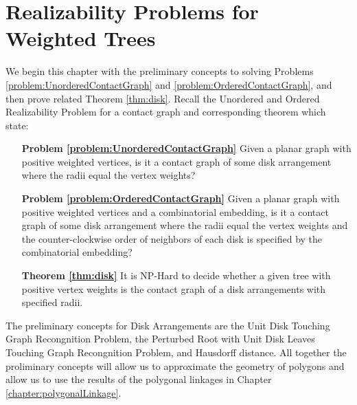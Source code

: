 \chapter{Realizability Problems for Weighted Trees}\label{chp:disk}

We begin this chapter with the preliminary concepts to solving Problems \ref{problem:UnorderedContactGraph} and \ref{problem:OrderedContactGraph}, and then prove related Theorem \ref{thm:disk}.  
Recall the Unordered and Ordered Realizability Problem for a contact graph  and corresponding theorem which state:

\begin{itemize}
\item[\textbf{Problem \ref{problem:UnorderedContactGraph}}] Given a planar graph with positive weighted vertices, is it a contact graph of some disk arrangement where the radii equal the vertex weights?
\item[\textbf{Problem \ref{problem:OrderedContactGraph}}] Given a planar graph with positive weighted vertices and a combinatorial embedding, is it a contact graph of some disk arrangement where the radii equal the vertex weights and the counter-clockwise order of neighbors of each disk is specified by the combinatorial embedding?
\item[\textbf{Theorem \ref{thm:disk}}] It is NP-Hard to decide whether a given tree with positive vertex weights
is the contact graph of a disk arrangements with specified radii.
\end{itemize}

The preliminary concepts for Disk Arrangements are the Unit Disk Touching Graph Recongnition Problem, the Perturbed Root with Unit Disk Leaves Touching Graph Recongnition Problem, and Hausdorff distance.  
All together the proliminary concepts will allow us to approximate the geometry of polygons and allow us to use the results of the polygonal linkages in Chapter \ref{chapter:polygonalLinkage}.

